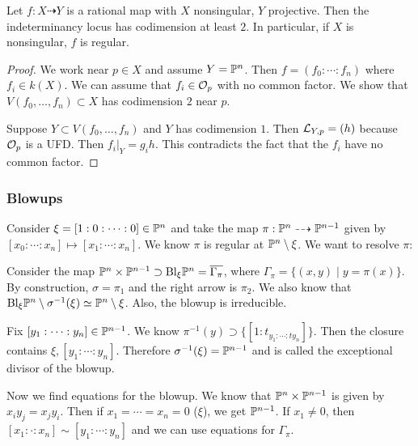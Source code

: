 \documentclass[twoside, 10pt]{article}
\begin{document}
    \begin{cor} Let $f: X \dashrightarrow Y$ is a rational map with $X$
        nonsingular, $Y$ projective. Then the indeterminancy locus has
        codimension at least $2$. In particular, if $X$ is nonsingular, $f$ is
        regular.  \begin{proof} We work near $p \in X$ and assume $Y = \P^n$.
            Then $f = (f_0: \cdots : f_n)$ where $f_i \in k(X)$. We can assume
            that $f_i \in \mc{O}_p$ with no common factor. We show that $V(f_0,
            \ldots, f_n) \subset X$ has codimension $2$ near $p$.

            Suppose $Y \subset V(f_0, \ldots, f_n)$ and $Y$ has codimension
        $1$. Then $\mc{L}_{Y,p} = (h)$ because $\mc{O}_p$ is a UFD. Then
    $f_i|_Y = g_ih$. This contradicts the fact that the $f_i$ have no common
factor.  \end{proof} \end{cor}
    
    \subsubsection{Blowups} \begin{exm} Consider $\xi = [1:0:\cdots:0] \in
        \P^n$ and take the map $\pi: \P^n \dashrightarrow \P^{n-1}$ given by
        $[x_0: \cdots :x_n] \mapsto [x_1:\cdots:x_n]$. We know $\pi$ is regular
        at $\P^n \setminus \xi$. We want to resolve $\pi$:

        \begin{center}  \end{center}

        Consider the map $\P^n \times \P^{n-1} \supset \mathrm{Bl}_{\xi}\P^n =
        \overline{\Gamma_{\pi}}$, where $\Gamma_{\pi} = \{(x,y) \mid y = \pi(x)
        \}$. By construction, $\sigma = \pi_1$ and the right arrow is $\pi_2$.
        We also know that $\mathrm{Bl}_{\xi}\P^n \setminus \sigma^{-1}(\xi)
        \simeq \P^n \setminus \xi$. Also, the blowup is irreducible. 
        
        Fix $[y_1: \cdots: y_n] \in \P^{n-1}$. We know $\pi^{-1}(y) \supset
        \{[1:t_{y_1: \cdots : ty_n}]\}$. Then the closure contains $\xi, [y_1:
        \cdots : y_n]$. Therefore $\sigma^{-1}(\xi) = \P^{n-1}$ and is called
        the exceptional divisor of the blowup.

        Now we find equations for the blowup. We know that $\P^n \times
        \P^{n-1}$ is given by $x_iy_j = x_jy_i$. Then if $x_1 = \cdots = x_n =
        0$ ($\xi$), we get $\P^{n-1}$. If $x_1 \neq 0$, then $[x_1:\cdot : x_n]
        \sim [y_1: \cdots : y_n]$ and we can use equations for $\Gamma_{\pi}$.
        \end{exm}
\end{document}
